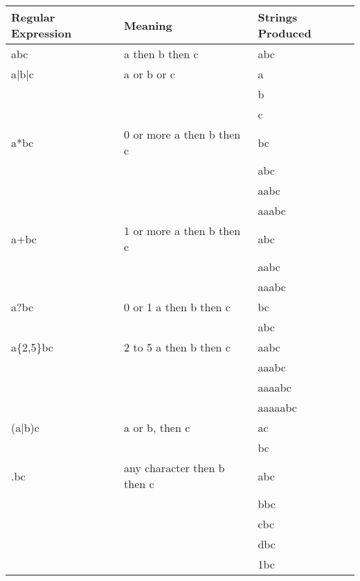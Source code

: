   \begin{table}[H]
  	\begin{tabular}{l | l | l}
  		Regular Expression & Meaning & Strings Produced \\\hline
  		abc         & a then b then c                 & abc \\\hline
  		a|b|c       & a or b or c                     & a \\
	  	            &                                 & b \\
	  	            &                                 & c \\\hline
	  	a*bc        & 0 or more a then b then c       & bc\\
	  	            &                                 & abc \\
	  	            &                                 & aabc \\
	  	            &                                 & aaabc \\\hline
	  	a+bc        & 1 or more a then b then c       & abc \\
	  	            &                                 & aabc \\
	  	            &                                 & aaabc \\\hline
	    a?bc        & 0 or 1 a then b then c          & bc \\
	                &                                 & abc \\\hline
	    a\{2,5\}bc  & 2 to 5 a then b then c          & aabc \\
	                &                                 & aaabc \\
	                &                                 & aaaabc \\
	                &                                 & aaaaabc \\\hline
	  	(a|b)c      & a or b, then c                  & ac \\
	  	            &                                 & bc \\\hline
	  	.bc         & any character then b then c     & abc\\
	  	            &                                 & bbc\\
	  	            &                                 & cbc\\
	  	            &                                 & dbc\\
	  	            &                                 & 1bc\\\hline

\end{tabular}
\end{table}
